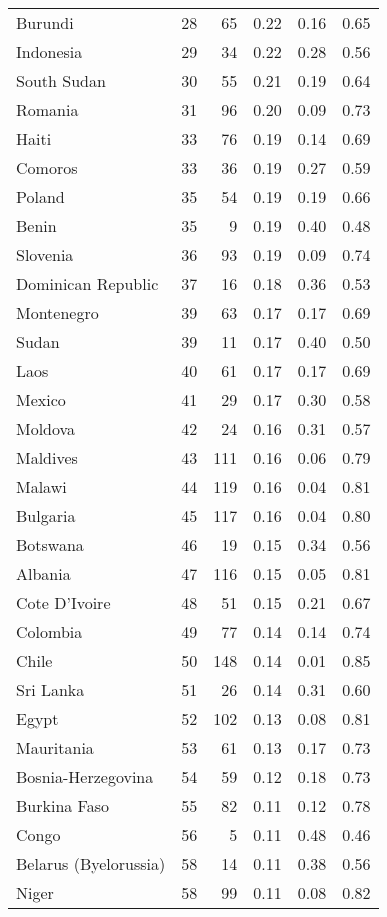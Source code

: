 \begin{longtable}[t]{lrrrrr}
Burundi & 28 & 65 & 0.22 & 0.16 & 0.65\\
Indonesia & 29 & 34 & 0.22 & 0.28 & 0.56\\
South Sudan & 30 & 55 & 0.21 & 0.19 & 0.64\\
\addlinespace
Romania & 31 & 96 & 0.20 & 0.09 & 0.73\\
Haiti & 33 & 76 & 0.19 & 0.14 & 0.69\\
Comoros & 33 & 36 & 0.19 & 0.27 & 0.59\\
Poland & 35 & 54 & 0.19 & 0.19 & 0.66\\
Benin & 35 & 9 & 0.19 & 0.40 & 0.48\\
\addlinespace
Slovenia & 36 & 93 & 0.19 & 0.09 & 0.74\\
Dominican Republic & 37 & 16 & 0.18 & 0.36 & 0.53\\
Montenegro & 39 & 63 & 0.17 & 0.17 & 0.69\\
Sudan & 39 & 11 & 0.17 & 0.40 & 0.50\\
Laos & 40 & 61 & 0.17 & 0.17 & 0.69\\
\addlinespace
Mexico & 41 & 29 & 0.17 & 0.30 & 0.58\\
Moldova & 42 & 24 & 0.16 & 0.31 & 0.57\\
Maldives & 43 & 111 & 0.16 & 0.06 & 0.79\\
Malawi & 44 & 119 & 0.16 & 0.04 & 0.81\\
Bulgaria & 45 & 117 & 0.16 & 0.04 & 0.80\\
\addlinespace
Botswana & 46 & 19 & 0.15 & 0.34 & 0.56\\
Albania & 47 & 116 & 0.15 & 0.05 & 0.81\\
Cote D'Ivoire & 48 & 51 & 0.15 & 0.21 & 0.67\\
Colombia & 49 & 77 & 0.14 & 0.14 & 0.74\\
Chile & 50 & 148 & 0.14 & 0.01 & 0.85\\
\addlinespace
Sri Lanka & 51 & 26 & 0.14 & 0.31 & 0.60\\
Egypt & 52 & 102 & 0.13 & 0.08 & 0.81\\
Mauritania & 53 & 61 & 0.13 & 0.17 & 0.73\\
Bosnia-Herzegovina & 54 & 59 & 0.12 & 0.18 & 0.73\\
Burkina Faso & 55 & 82 & 0.11 & 0.12 & 0.78\\
\addlinespace
Congo & 56 & 5 & 0.11 & 0.48 & 0.46\\
Belarus (Byelorussia) & 58 & 14 & 0.11 & 0.38 & 0.56\\
Niger & 58 & 99 & 0.11 & 0.08 & 0.82\\

\end{longtable}
